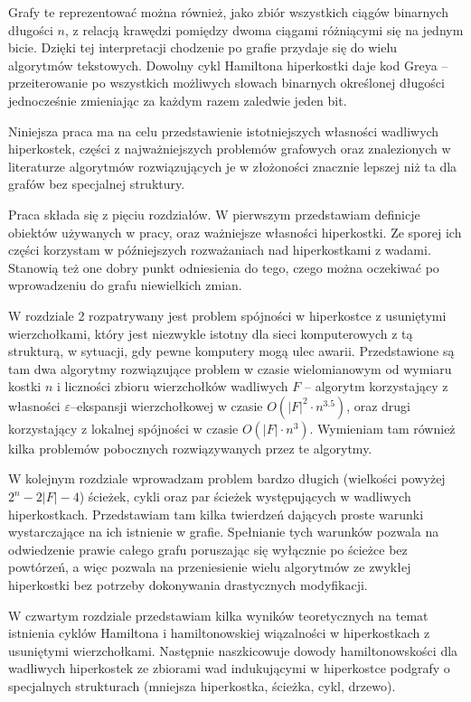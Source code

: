 \documentclass{pracamgr}
\begin{document}
  Grafy te reprezentować można również, jako zbiór wszystkich ciągów binarnych długości $n$,
  z relacją krawędzi pomiędzy dwoma ciągami różniącymi się na jednym bicie.
  Dzięki tej interpretacji chodzenie po grafie przydaje się do wielu algorytmów tekstowych. Dowolny cykl Hamiltona hiperkostki
  daje kod Greya -- przeiterowanie po wszystkich możliwych słowach binarnych określonej długości jednocześnie zmieniając za każdym razem zaledwie jeden
  bit.\newline
  
  Niniejsza praca ma na celu przedstawienie istotniejszych własności wadliwych hiperkostek, części z najważniejszych problemów grafowych
  oraz znalezionych w literaturze algorytmów rozwiązujących je w złożoności znacznie lepszej niż ta dla grafów bez specjalnej struktury.
  
  Praca składa się z pięciu rozdziałów. W pierwszym przedstawiam definicje obiektów używanych w pracy, oraz ważniejsze własności
  hiperkostki. Ze sporej ich części korzystam w późniejszych rozważaniach nad hiperkostkami z wadami.
  Stanowią też one dobry punkt odniesienia do tego, czego można oczekiwać po wprowadzeniu do grafu niewielkich zmian.
  
  W rozdziale 2 rozpatrywany jest problem spójności w hiperkostce z usuniętymi wierzchołkami, który jest niezwykle istotny dla sieci komputerowych
  z tą strukturą, w sytuacji, gdy pewne komputery mogą ulec awarii. Przedstawione są tam dwa algorytmy rozwiązujące problem w czasie wielomianowym od wymiaru kostki $n$
  i liczności zbioru wierzchołków wadliwych $F$ -- algorytm korzystający z własności $\varepsilon$--ekspansji wierzchołkowej w czasie $O(|F|^2\cdot n^{3.5})$,
  oraz drugi korzystający z lokalnej spójności w czasie $O(|F|\cdot n^3)$. Wymieniam tam również kilka problemów pobocznych rozwiązywanych przez te algorytmy.
  
  W kolejnym rozdziale wprowadzam problem bardzo długich (wielkości powyżej $2^n-2|F|-4$) ścieżek, cykli oraz par ścieżek występujących w wadliwych hiperkostkach.
  Przedstawiam tam kilka twierdzeń dających proste warunki wystarczające na ich istnienie w grafie.
  Spełnianie tych warunków pozwala na odwiedzenie prawie całego grafu poruszając się wyłącznie po ścieżce bez powtórzeń,
  a więc pozwala na przeniesienie wielu algorytmów ze zwykłej hiperkostki bez potrzeby dokonywania drastycznych modyfikacji.

  W czwartym rozdziale przedstawiam kilka wyników teoretycznych na temat istnienia cyklów Hamiltona i hamiltonowskiej wiązalności w hiperkostkach z usuniętymi
  wierzchołkami. Następnie naszkicowuje dowody hamiltonowskości dla wadliwych hiperkostek ze zbiorami wad indukującymi w hiperkostce
  podgrafy o specjalnych strukturach (mniejsza hiperkostka, ścieżka, cykl, drzewo).
  
\end{document}
